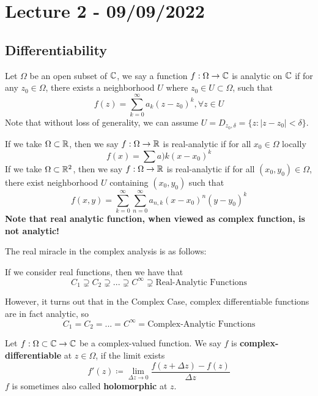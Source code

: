 \section{Lecture 2 - 09/09/2022}

\subsection{Differentiability}

\begin{definition}
Let $\Omega$ be an open subset of $\mathbb{C}$, we say a function $f: \Omega \to \mathbb{C}$ is analytic on $\mathbb{C}$ if for any $z_0 \in \Omega$, there exists a neighborhood $U$ where $z_0 \in U \subset \Omega$, such that
\[f(z) = \sum_{k = 0}^\infty a_k (z - z_0)^k, \forall z \in U\]
Note that without loss of generality, we can assume $U = D_{z_0, \delta} = \{z: |z - z_0| < \delta\}$.
\end{definition}

\begin{remark}
    If we take $\Omega \subset \mathbb{R}$, then we say $f: \Omega \to \mathbb{R}$ is real-analytic if for all $x_0 \in \Omega$ locally
    \[f(x) = \sum a)k (x - x_0)^k\]
    If we take $\Omega \subset \mathbb{R}^2$, then we say $f: \Omega \to \mathbb{R}$ is real-analytic if for all $(x_0, y_0) \in \Omega$, there exist neighborhood $U$ containing $(x_0, y_0)$ such that
    \[f(x, y) = \sum_{k = 0}^\infty \sum_{n = 0}^\infty a_{n, k} (x - x_0)^n (y - y_0)^k\]
    \textbf{Note that real analytic function, when viewed as complex function, is not analytic!}
\end{remark}

The real miracle in the complex analysis is as follows:

If we consider real functions, then we have that
\[C_1 \supsetneq C_2 \supsetneq ... \supsetneq C^\infty \supsetneq \text{Real-Analytic Functions}\]

However, it turns out that in the Complex Case, complex differentiable functions are in fact analytic, so
\[C_1 = C_2 = ... = C^\infty = \text{Complex-Analytic Functions}\]


\begin{definition}
Let $f: \Omega \subset \mathbb{C} \to \mathbb{C}$ be a complex-valued function. We say $f$ is \textbf{complex-differentiable} at $z \in \Omega$, if the limit exists
\[f'(z) \coloneqq \lim_{\Delta z \to 0} \frac{f(z + \Delta z) - f(z)}{\Delta z}\]
$f$ is sometimes also called \textbf{holomorphic} at $z$.
\end{definition}

